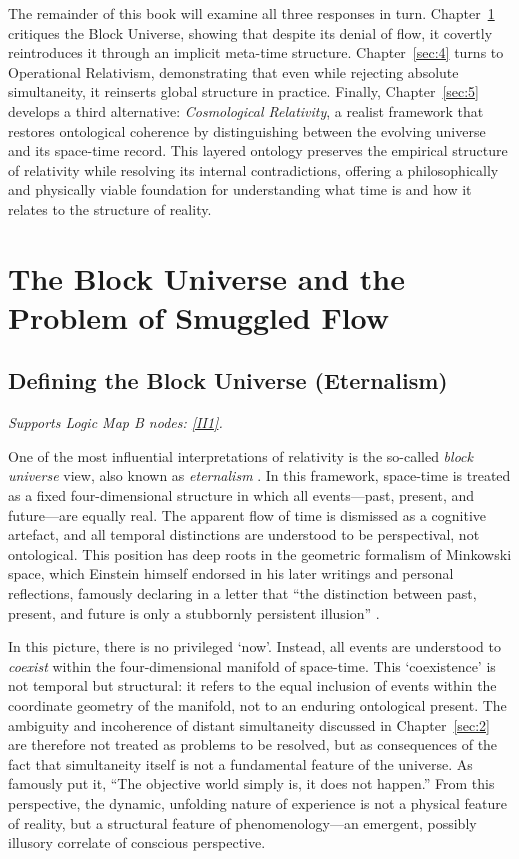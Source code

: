 \documentclass[12pt]{book}
\begin{document}
The remainder of this book will examine all three responses in turn. Chapter~\ref{sec:3} critiques the Block Universe, showing that despite its denial of flow, it covertly reintroduces it through an implicit meta-time structure. Chapter~\ref{sec:4} turns to Operational Relativism, demonstrating that even while rejecting absolute simultaneity, it reinserts global structure in practice. Finally, Chapter~\ref{sec:5} develops a third alternative: \textit{Cosmological Relativity}, a realist framework that restores ontological coherence by distinguishing between the evolving universe and its space-time record. This layered ontology preserves the empirical structure of relativity while resolving its internal contradictions, offering a philosophically and physically viable foundation for understanding what time is and how it relates to the structure of reality.

\chapter[The Block Universe]{The Block Universe and the Problem of Smuggled Flow}\label{sec:3}

\section{Defining the Block Universe (Eternalism)}\label{sec:3.1}
\noindent\textit{Supports Logic Map B nodes: \hyperref[appendix:II1]{[II1]}.}

\vspace{4pt}

One of the most influential interpretations of relativity is the so-called \textit{block universe} view, also known as \textit{eternalism} \citep{putnam1967,skow2015}. In this framework, space-time is treated as a fixed four-dimensional structure in which all events---past, present, and future---are equally real. The apparent flow of time is dismissed as a cognitive artefact, and all temporal distinctions are understood to be perspectival, not ontological. This position has deep roots in the geometric formalism of Minkowski space, which Einstein himself endorsed in his later writings and personal reflections, famously declaring in a letter that ``the distinction between past, present, and future is only a stubbornly persistent illusion'' \citep{einstein1955letter}.

In this picture, there is no privileged `now'. Instead, all events are understood to \textit{coexist} within the four-dimensional manifold of space-time. This `coexistence' is not temporal but structural: it refers to the equal inclusion of events within the coordinate geometry of the manifold, not to an enduring ontological present. The ambiguity and incoherence of distant simultaneity discussed in Chapter~\ref{sec:2} are therefore not treated as problems to be resolved, but as consequences of the fact that simultaneity itself is not a fundamental feature of the universe. As \citet{weyl1949} famously put it, ``The objective world simply is, it does not happen.'' From this perspective, the dynamic, unfolding nature of experience is not a physical feature of reality, but a structural feature of phenomenology---an emergent, possibly illusory correlate of conscious perspective.
\end{document}
